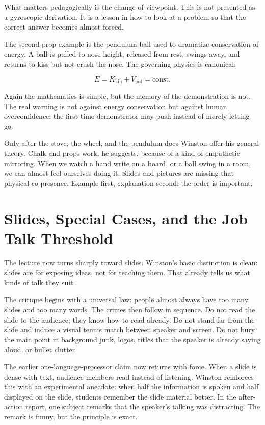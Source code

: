 What matters pedagogically is the change of viewpoint. This is not presented as a gyroscopic derivation. It is a lesson in how to look at a problem so that the correct answer becomes almost forced.

The second prop example is the pendulum ball used to dramatize conservation of energy. A ball is pulled to nose height, released from rest, swings away, and returns to kiss but not crush the nose. The governing physics is canonical:

\begin{equation}
E = K_{\mathrm{kin}} + V_{\mathrm{pot}} = \text{const.}
\end{equation}

Again the mathematics is simple, but the memory of the demonstration is not. The real warning is not against energy conservation but against human overconfidence: the first-time demonstrator may push instead of merely letting go.

Only after the stove, the wheel, and the pendulum does Winston offer his general theory. Chalk and props work, he suggests, because of a kind of empathetic mirroring. When we watch a hand write on a board, or a ball swing in a room, we can almost feel ourselves doing it. Slides and pictures are missing that physical co-presence. Example first, explanation second: the order is important.

\section{Slides, Special Cases, and the Job Talk Threshold}

The lecture now turns sharply toward slides. Winston's basic distinction is clean: slides are for exposing ideas, not for teaching them. That already tells us what kinds of talk they suit.

The critique begins with a universal law: people almost always have too many slides and too many words. The crimes then follow in sequence. Do not read the slide to the audience; they know how to read already. Do not stand far from the slide and induce a visual tennis match between speaker and screen. Do not bury the main point in background junk, logos, titles that the speaker is already saying aloud, or bullet clutter.

The earlier one-language-processor claim now returns with force. When a slide is dense with text, audience members read instead of listening. Winston reinforces this with an experimental anecdote: when half the information is spoken and half displayed on the slide, students remember the slide material better. In the after-action report, one subject remarks that the speaker's talking was distracting. The remark is funny, but the principle is exact.

